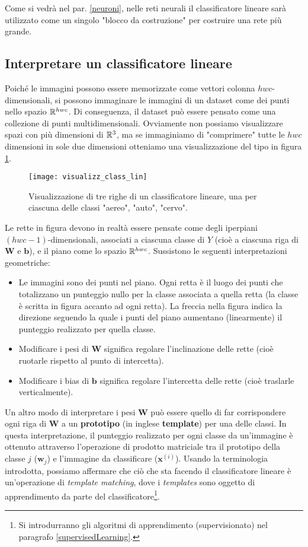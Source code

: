 Come si vedrà nel par. \ref{neuroni}, nelle reti neurali il classificatore lineare sarà utilizzato come un singolo "blocco da costruzione" per costruire una rete più grande.

\subsection*{Interpretare un classificatore lineare}

Poiché le immagini possono essere memorizzate come vettori colonna $hwc$-dimensionali, si possono immaginare le immagini di un dataset come dei punti nello spazio $\mathbb{R}^{hwc}$. Di conseguenza, il dataset può essere pensato come una collezione di punti multidimensionali. Ovviamente non possiamo visualizzare spazi con più dimensioni di $\mathbb{R}^{3}$, ma se immaginiamo di "comprimere" tutte le $hwc$ dimensioni in sole due dimensioni otteniamo una visualizzazione del tipo in figura \ref{visual_class_lin}.

\begin{figure}[h]
\centering
\texttt{[image: visualizz\_class\_lin]}
\caption{Visualizzazione di tre righe di un classificatore lineare, una per ciascuna delle classi "aereo", "auto", "cervo".}
\label{visual_class_lin}
\end{figure}

Le rette in figura devono in realtà essere pensate come degli iperpiani $(hwc-1)$-dimensionali, associati a ciascuna classe di $Y$ (cioè a ciascuna riga di $\mathbf{W}$ e $\mathbf{b}$), e il piano come lo spazio $\mathbb{R}^{hwc}$. Sussistono le seguenti interpretazioni geometriche:
\begin{itemize}
\item Le immagini sono dei punti nel piano. Ogni retta è il luogo dei punti che totalizzano un punteggio nullo per la classe associata a quella retta (la classe è scritta in figura accanto ad ogni retta). La freccia nella figura indica la direzione seguendo la quale i punti del piano aumentano (linearmente) il punteggio realizzato per quella classe.
\item Modificare i pesi di $\mathbf{W}$ significa regolare l'inclinazione delle rette (cioè ruotarle rispetto al punto di intercetta).
\item Modificare i bias di $\mathbf{b}$ significa regolare l'intercetta delle rette (cioè traslarle verticalmente).
\end{itemize}

Un altro modo di interpretare i pesi $\mathbf{W}$ può essere quello di far corrispondere ogni riga di $\mathbf{W}$ a un \textbf{prototipo} (in inglese \textbf{template}) per una delle classi. In questa interpretazione, il punteggio realizzato per ogni classe da un'immagine è ottenuto attraverso l'operazione di prodotto matriciale tra il prototipo della classe $j$ ($\mathbf{w}_j$) e l'immagine da classificare ($\mathbf{x}^{(i)}$).
Usando la terminologia introdotta, possiamo affermare che ciò che sta facendo il classificatore lineare è un'operazione di \textit{template matching}, dove i \textit{templates} sono oggetto di apprendimento da parte del classificatore\footnote{Si introdurranno gli algoritmi di apprendimento (supervisionato) nel paragrafo \ref{supervisedLearning}.}.

